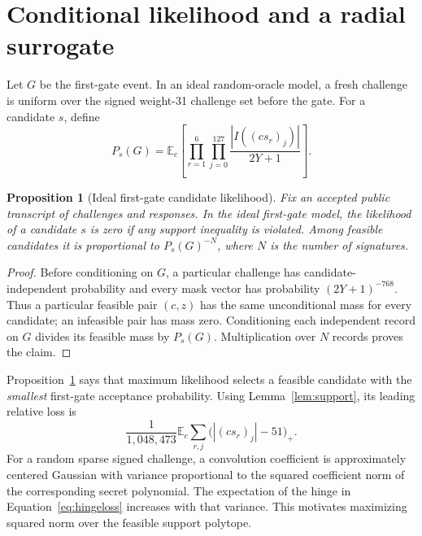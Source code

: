 \documentclass[11pt,a4paper]{article}
\newtheorem{proposition}[theorem]{Proposition}
\newcommand{\E}{\mathbb{E}}
\begin{document}
\section{Conditional likelihood and a radial surrogate}
\label{sec:likelihood}

Let $G$ be the first-gate event.  In an ideal random-oracle model, a fresh
challenge is uniform over the signed weight-31 challenge set before the gate.
For a candidate $s$, define
\begin{equation}
 P_s(G)=\E_c\left[
     \prod_{r=1}^{6}\prod_{j=0}^{127}
       \frac{|I((cs_r)_j)|}{2Y+1}
                  \right].
\label{eq:acceptance}
\end{equation}

\begin{proposition}[Ideal first-gate candidate likelihood]
\label{prop:likelihood}
Fix an accepted public transcript of challenges and responses.  In the ideal
first-gate model, the likelihood of a candidate $s$ is zero if any support
inequality is violated.  Among feasible candidates it is proportional to
$P_s(G)^{-N}$, where $N$ is the number of signatures.
\end{proposition}

\begin{proof}
Before conditioning on $G$, a particular challenge has candidate-independent
probability and every mask vector has probability $(2Y+1)^{-768}$.  Thus a
particular feasible pair $(c,z)$ has the same unconditional mass for every
candidate; an infeasible pair has mass zero.  Conditioning each independent
record on $G$ divides its feasible mass by $P_s(G)$.  Multiplication over
$N$ records proves the claim.
\end{proof}

Proposition~\ref{prop:likelihood} says that maximum likelihood selects a
feasible candidate with the \emph{smallest} first-gate acceptance probability.
Using Lemma~\ref{lem:support}, its leading relative loss is
\begin{equation}
 \frac{1}{1{,}048{,}473}
 \E_c\sum_{r,j}\bigl(|(cs_r)_j|-51\bigr)_+.
\label{eq:hingeloss}
\end{equation}
For a random sparse signed challenge, a convolution coefficient is
approximately centered Gaussian with variance proportional to the squared
coefficient norm of the corresponding secret polynomial.  The expectation
of the hinge in Equation~\eqref{eq:hingeloss} increases with that variance.
This motivates maximizing squared norm over the feasible support polytope.
\end{document}
